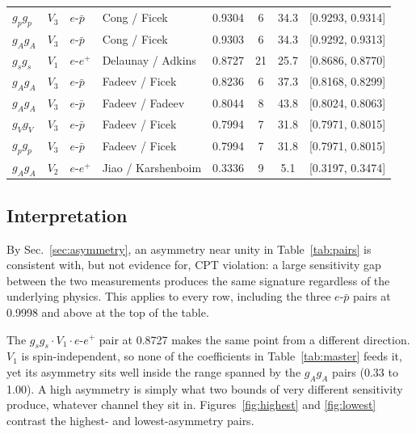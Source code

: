 \documentclass[
  aps,
  prd,
  reprint,
  amsmath,
  amssymb,
  nofootinbib,
  superscriptaddress,
  floatfix
]{revtex4-2}
\begin{document}
\begin{table}[t]
\begin{ruledtabular}
\begin{tabular}{lllldccl}
$g_pg_p$ & $V_3$ & $e$-$\bar p$ & Cong \cite{Cong2025b} / Ficek \cite{Ficek2018} & 0.9304 & 6 & 34.3 & [0.9293, 0.9314] \\
$g_Ag_A$ & $V_3$ & $e$-$\bar p$ & Cong \cite{Cong2025b} / Ficek \cite{Ficek2018} & 0.9303 & 6 & 34.3 & [0.9292, 0.9313] \\
$g_sg_s$ & $V_1$ & $e$-$e^+$ & Delaunay \cite{Delaunay2017} / Adkins \cite{Adkins2022} & 0.8727 & 21 & 25.7 & [0.8686, 0.8770] \\
$g_Ag_A$ & $V_3$ & $e$-$\bar p$ & Fadeev \cite{Fadeev2022} / Ficek \cite{Ficek2018} & 0.8236 & 6 & 37.3 & [0.8168, 0.8299] \\
$g_Ag_A$ & $V_3$ & $e$-$\bar p$ & Fadeev \cite{Fadeev2022} / Fadeev \cite{Fadeev2022} & 0.8044 & 8 & 43.8 & [0.8024, 0.8063] \\
$g_Vg_V$ & $V_3$ & $e$-$\bar p$ & Fadeev \cite{Fadeev2022} / Ficek \cite{Ficek2018} & 0.7994 & 7 & 31.8 & [0.7971, 0.8015] \\
$g_pg_p$ & $V_3$ & $e$-$\bar p$ & Fadeev \cite{Fadeev2022} / Ficek \cite{Ficek2018} & 0.7994 & 7 & 31.8 & [0.7971, 0.8015] \\
$g_Ag_A$ & $V_2$ & $e$-$e^+$ & Jiao \cite{Jiao2020} / Karshenboim \cite{Karshenboim2011} & 0.3336 & 9 & 5.1 & [0.3197, 0.3474] \\
\end{tabular}
\end{ruledtabular}
\end{table}

\subsection{Interpretation}

By Sec.~\ref{sec:asymmetry}, an asymmetry near unity in
Table~\ref{tab:pairs} is consistent with, but not evidence for, CPT
violation: a large sensitivity gap between the two measurements produces
the same signature regardless of the underlying physics. This applies to
every row, including the three $e$-$\bar p$ pairs at 0.9998 and above at the
top of the table.

The $g_sg_s\cdot V_1\cdot e$-$e^+$ pair at 0.8727 makes the same point
from a different direction. $V_1$ is spin-independent, so none of the
coefficients in Table~\ref{tab:master} feeds it, yet its asymmetry sits
well inside the range spanned by the $g_Ag_A$ pairs (0.33 to 1.00). A high asymmetry is simply what two
bounds of very different sensitivity produce, whatever channel they sit in. Figures~\ref{fig:highest} and \ref{fig:lowest} contrast the
highest- and lowest-asymmetry pairs.
\end{document}
